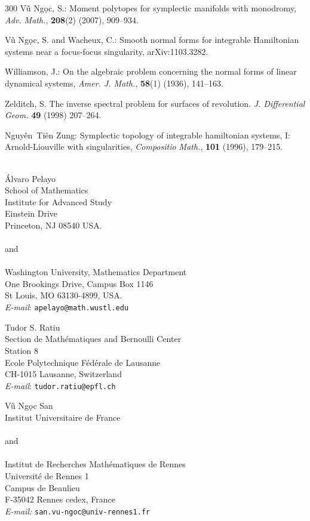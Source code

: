 \documentclass[11pt]{article}
\begin{document}
{\begin{thebibliography}{300}
   V\~{u} Ng\d{o}c, S.: Moment polytopes for
    symplectic manifolds with monodromy, \textit{Adv. Math.},
    \textbf{208}(2) (2007), 909--934.

   V\~{u} Ng\d{o}c, S. and Wacheux, C.: Smooth
    normal forms for integrable Hamiltonian systems near a focus-focus
    singularity, arXiv:1103.3282.

   Williamson, J.: On the algebraic problem
    concerning the normal forms of linear dynamical systems,
    \textit{Amer. J. Math.}, \textbf{58}(1) (1936), 141--163.

   Zelditch, S. The inverse spectral problem for
    surfaces of revolution.  \emph{J. Differential Geom.} {\bf 49}
    (1998) 207--264.

   Nguy{\^e}n~Ti{\^e}n Zung: Symplectic topology of
    integrable hamiltonian systems, {I}: Arnold-Liouville with
    singularities, \textit{Compositio Math.}, \textbf{101} (1996),
    179--215.


\end{thebibliography}
}



\noindent
\\
\'Alvaro Pelayo \\
School of Mathematics\\
Institute for Advanced Study\\
Einstein Drive\\
Princeton, NJ 08540 USA.
\\
\\
and
\\
\\
\noindent
Washington University,  Mathematics Department \\
One Brookings Drive, Campus Box 1146\\
St Louis, MO 63130-4899, USA.\\
{\em E\--mail}: \texttt{apelayo@math.wustl.edu}




\medskip\noindent



\smallskip\noindent
Tudor S. Ratiu\\
Section de Math\'ematiques and Bernoulli Center\\
Station 8\\
Ecole Polytechnique F\'ed\'erale
de Lausanne\\
CH-1015 Lausanne, Switzerland\\
{\em E\--mail}: \texttt{tudor.ratiu@epfl.ch}

\medskip\noindent

\noindent
V\~u Ng\d oc San\\
Institut Universitaire de France\\
\\
and\\
\\
Institut de Recherches Math\'ematiques de Rennes\\
Universit\'e de Rennes 1\\
Campus de Beaulieu\\
F-35042 Rennes cedex, France\\
{\em E-mail:} \texttt{san.vu-ngoc@univ-rennes1.fr}
\end{document}
